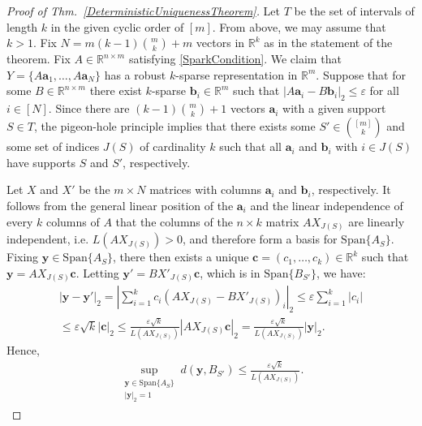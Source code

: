 \documentclass[journal, twocolumn]{IEEEtran}
\begin{document}
\begin{proof}[Proof of Thm.~\ref{DeterministicUniquenessTheorem}]
Let $T$ be the set of intervals of length $k$ in the given cyclic order of $[m]$. From above, we may assume that $k > 1$. Fix $N = m(k-1){m \choose k}+m$ vectors in $\mathbb{R}^k$ as in the statement of the theorem. Fix $A \in \mathbb{R}^{n \times m}$ satisfying \eqref{SparkCondition}. We claim that $Y = \{A\mathbf{a}_1, \ldots, A\mathbf{a}_N\}$ has a robust $k$-sparse representation in $\mathbb{R}^m$. Suppose that for some $B \in \mathbb{R}^{n \times m}$ there exist $k$-sparse $\mathbf{b}_i \in \mathbb{R}^m$ such that $|A\mathbf{a}_i - B\mathbf{b}_i|_2 \leq \varepsilon$ for all $i \in [N]$. Since there are $(k-1){m \choose k}+1$ vectors $\mathbf{a}_i$ with a given support $S \in T$, the pigeon-hole principle implies that there exists some $S' \in {[m] \choose k}$ and some set of indices $J(S)$ of cardinality $k$ such that all $\mathbf{a}_i$ and $\mathbf{b}_i$ with $i \in J(S)$ have supports $S$ and $S'$, respectively.

Let $X$ and $X'$ be the $m \times N$ matrices with columns $\mathbf{a}_i$ and $\mathbf{b}_i$, respectively. It follows from the general linear position of the $\mathbf{a}_i$ and the linear independence of every $k$ columns of $A$ that the columns of the $n \times k$ matrix $AX_{J(S)}$ are linearly independent, i.e. $L(AX_{J(S)}) > 0$, and therefore form a basis for $\text{Span}\{A_{S}\}$. Fixing $\mathbf{y} \in \text{Span}\{A_{S}\}$, there then exists a unique $\mathbf{c} = (c_1, \ldots, c_k) \in \mathbb{R}^k$ such that $\mathbf{y} = AX_{J(S)}\mathbf{c}$. Letting $\mathbf{y'} = BX'_{J(S)}\mathbf{c}$, which is in $\text{Span}\{B_{S'}\}$, we have:
\begin{align*}
|\mathbf{y} - \mathbf{y'}|_2 
= |\sum_{i=1}^k c_i(AX_{J(S)} - BX'_{J(S)})_i|_2 
\leq \varepsilon \sum_{i=1}^k |c_i| \\
\leq \varepsilon \sqrt{k}  |\mathbf{c}|_2 
\leq \frac{\varepsilon \sqrt{k}}{L(AX_{J(S)})} |AX_{J(S)}\mathbf{c}|_2 = \frac{\varepsilon \sqrt{k}}{L(AX_{J(S)})} |\mathbf{y}|_2.
\end{align*}
Hence,
\begin{align}\label{ABSubspaceDistance}
\sup_{ \substack{ \mathbf{y} \in \text{Span}\{A_{S}\} \\ |\mathbf{y}|_2 = 1} } d(\mathbf{y}, B_{S'}) \leq \frac{\varepsilon\sqrt{k}}{L(AX_{J(S)})}.
\end{align}


\end{proof}
\end{document}
